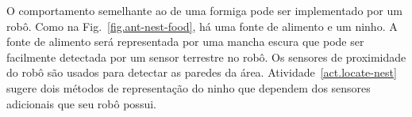 
O comportamento semelhante ao de uma formiga pode ser implementado por um robô.\label{s.ant-like-algo} Como na Fig.~\ref{fig.ant-nest-food}, há uma fonte de alimento e um ninho. A fonte de alimento será representada por uma mancha escura que pode ser facilmente detectada por um sensor terrestre no robô. Os sensores de proximidade do robô são usados para detectar as paredes da área. Atividade~\ref{act.locate-nest} sugere dois métodos de representação do ninho que dependem dos sensores adicionais que seu robô possui.

